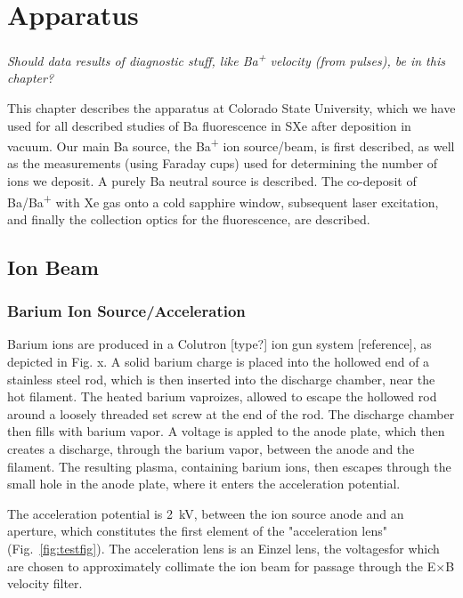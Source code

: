 \chapter{Apparatus}

{\color{gray}\emph{Should data results of diagnostic stuff, like Ba\textsuperscript{+} velocity (from pulses), be in this chapter?}}

This chapter describes the apparatus at Colorado State University, which we have used for all described studies of Ba fluorescence in SXe after deposition in vacuum.  Our main Ba source, the Ba\textsuperscript{+} ion source/beam, is first described, as well as the measurements (using Faraday cups) used for determining the number of ions we deposit.  A purely Ba neutral source is described.  The co-deposit of Ba/Ba\textsuperscript{+} with Xe gas onto a cold sapphire window, subsequent laser excitation, and finally the collection optics for the fluorescence, are described.

%

\section{Ion Beam}

\subsection{Barium Ion Source/Acceleration}

Barium ions are produced in a Colutron [type?] ion gun system [reference], as depicted in Fig. x.  A solid barium charge is placed into the hollowed end of a stainless steel rod, which is then inserted into the discharge chamber, near the hot filament.  The heated barium vaproizes, allowed to escape the hollowed rod around a loosely threaded set screw at the end of the rod.  The discharge chamber then fills with barium vapor.  A voltage is appled to the anode plate, which then creates a discharge, through the barium vapor, between the anode and the filament.  The resulting plasma, containing barium ions, then escapes through the small hole in the anode plate, where it enters the acceleration potential.  

The acceleration potential is 2~kV, between the ion source anode and an aperture, which constitutes the first element of the "acceleration lens" (Fig.~\ref{fig:testfig}).  The acceleration lens is an Einzel lens, the voltagesfor which are chosen to approximately collimate the ion beam for passage through the E$\times$B velocity filter.

